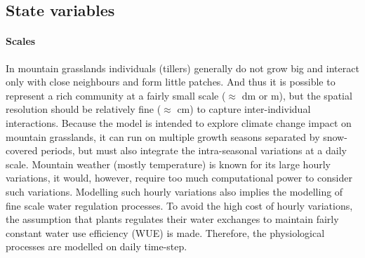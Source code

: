 \subsection{State variables}

\paragraph{Scales}
In mountain grasslands individuals (tillers) generally do not grow big and interact only with close neighbours and form little patches. And thus it is possible to represent a rich community at a fairly small scale ($\approx$ dm or m), but the spatial resolution should be relatively fine ($\approx$ cm) to capture inter-individual interactions. Because the model is intended to explore climate change impact on mountain grasslands, it can run on multiple growth seasons separated by snow-covered periods, but must also integrate the intra-seasonal variations at a daily scale. Mountain weather (mostly temperature) is known for its large hourly variations, it would, however, require too much computational power to consider such variations. Modelling such hourly variations also implies the modelling of fine scale water regulation processes. To avoid the high cost of hourly variations, the assumption that plants regulates their water exchanges to maintain fairly constant water use efficiency (WUE) is made. Therefore, the physiological processes are modelled on daily time-step.

